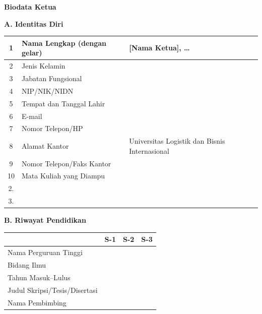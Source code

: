 
\textbf{Biodata Ketua}

\textbf{A. Identitas Diri}
\begin{table}[h]
    \begin{tabularx}{\textwidth}{|c|X|X|}
        \hline
        1 & Nama Lengkap (dengan gelar) & {[Nama Ketua]}, \ldots \\ \hline
        2 & Jenis Kelamin & \\ \hline
        3 & Jabatan Fungsional & \\ \hline
        4 & NIP/NIK/NIDN & \\ \hline
        5 & Tempat dan Tanggal Lahir & \\ \hline
        6 & E-mail & \\ \hline
        7 & Nomor Telepon/HP & \\ \hline
        8 & Alamat Kantor & Universitas Logistik dan Bisnis Internasional \\ \hline
        9 & Nomor Telepon/Faks Kantor & \\ \hline
        10 & Mata Kuliah yang Diampu & \begin{tabular}[t]{@{}l@{}} 1. \\ 2. \\ 3. \end{tabular} \\ \hline
    \end{tabularx}
\end{table}

\textbf{B. Riwayat Pendidikan}
\begin{table}[h]
    \begin{tabularx}{\textwidth}{|X|X|X|X|}
        \hline
        & \textbf{S-1} & \textbf{S-2} & \textbf{S-3} \\ \hline
        Nama Perguruan Tinggi & & & \\ \hline
        Bidang Ilmu & & & \\ \hline
        Tahun Masuk--Lulus & & & \\ \hline
        Judul Skripsi/Tesis/Disertasi & & & \\ \hline
        Nama Pembimbing & & & \\ \hline
    \end{tabularx}
\end{table}

